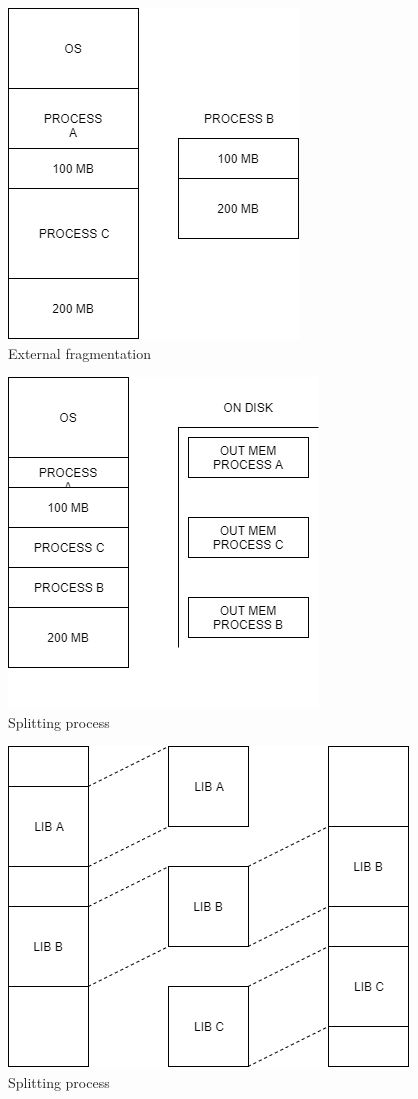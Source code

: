 \begin{figure}
\centering
\caption{External fragmentation}
\label{fig:externalfragmentation}
\includegraphics[scale=0.5]{images/external_fragmentation.png}
\end{figure}

\begin{figure}
\centering
\caption{Splitting process}
\label{fig:splitprocess}
\includegraphics[scale=0.5]{images/splitting_process.png}
\end{figure}

\begin{figure}
\centering
\caption{Splitting process}
\label{fig:samelib}
\includegraphics[scale=0.5]{images/use_same_lib.png}
\end{figure}
